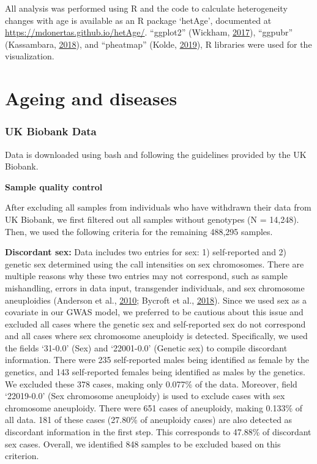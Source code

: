 \documentclass[12pt,twoside]{unicam}
\begin{document}
All analysis was performed using R and the code to calculate heterogeneity changes with age is available as an R package `hetAge', documented at \url{https://mdonertas.github.io/hetAge/}. ``ggplot2'' (Wickham, \protect\hyperlink{ref-Wickham2017}{2017}), ``ggpubr'' (Kassambara, \protect\hyperlink{ref-Kassambara2018}{2018}), and ``pheatmap'' (Kolde, \protect\hyperlink{ref-Kolde2019}{2019}), R libraries were used for the visualization.

\hypertarget{ageing-and-diseases}{%
\section{Ageing and diseases}\label{ageing-and-diseases}}

\hypertarget{uk-biobank-data}{%
\subsubsection{UK Biobank Data}\label{uk-biobank-data}}

Data is downloaded using bash and following the guidelines provided by the UK Biobank.

\textbf{Sample quality control}

After excluding all samples from individuals who have withdrawn their data from UK Biobank, we first filtered out all samples without genotypes (N = 14,248). Then, we used the following criteria for the remaining 488,295 samples.

\textbf{Discordant sex:} Data includes two entries for sex: 1) self-reported and 2) genetic sex determined using the call intensities on sex chromosomes. There are multiple reasons why these two entries may not correspond, such as sample mishandling, errors in data input, transgender individuals, and sex chromosome aneuploidies (Anderson et al., \protect\hyperlink{ref-Anderson2010}{2010}; Bycroft et al., \protect\hyperlink{ref-Bycroft2018}{2018}). Since we used sex as a covariate in our GWAS model, we preferred to be cautious about this issue and excluded all cases where the genetic sex and self-reported sex do not correspond and all cases where sex chromosome aneuploidy is detected. Specifically, we used the fields `31-0.0' (Sex) and `22001-0.0' (Genetic sex) to compile discordant information. There were 235 self-reported males being identified as female by the genetics, and 143 self-reported females being identified as males by the genetics. We excluded these 378 cases, making only 0.077\% of the data. Moreover, field `22019-0.0' (Sex chromosome aneuploidy) is used to exclude cases with sex chromosome aneuploidy. There were 651 cases of aneuploidy, making 0.133\% of all data. 181 of these cases (27.80\% of aneuploidy cases) are also detected as discordant information in the first step. This corresponds to 47.88\% of discordant sex cases. Overall, we identified 848 samples to be excluded based on this criterion.
\end{document}
